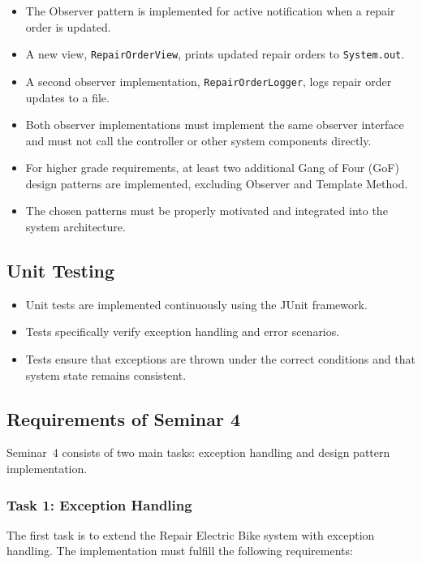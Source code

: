 \documentclass[a4paper]{scrartcl}
\begin{document}
\begin{itemize}
    \item The Observer pattern is implemented for active notification when a repair order is updated.
    \item A new view, \texttt{RepairOrderView}, prints updated repair orders to \texttt{System.out}.
    \item A second observer implementation, \texttt{RepairOrderLogger}, logs repair order updates to a file.
    \item Both observer implementations must implement the same observer interface and must not call the controller or other system components directly.
    \item For higher grade requirements, at least two additional Gang of Four (GoF) design patterns are implemented, excluding Observer and Template Method.
    \item The chosen patterns must be properly motivated and integrated into the system architecture.
\end{itemize}

\subsection*{Unit Testing}

\begin{itemize}
    \item Unit tests are implemented continuously using the JUnit framework.
    \item Tests specifically verify exception handling and error scenarios.
    \item Tests ensure that exceptions are thrown under the correct conditions and that system state remains consistent.
\end{itemize}


\iffalse

\subsection{Requirements of Seminar 4}

Seminar~4 consists of two main tasks: exception handling and design pattern implementation.

\subsubsection*{Task 1: Exception Handling}

The first task is to extend the Repair Electric Bike system with exception handling. The implementation must fulfill the following requirements:
\end{document}
